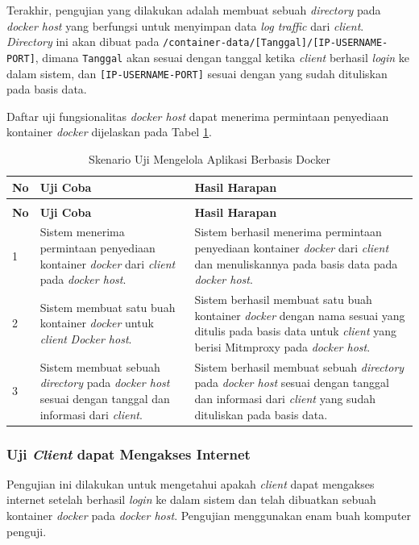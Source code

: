 Terakhir, pengujian yang dilakukan adalah membuat sebuah \textit{directory} pada \textit{docker host} yang berfungsi untuk menyimpan data \textit{log traffic} dari \textit{client}. \textit{Directory} ini akan dibuat pada \texttt{/container-data/[Tanggal]/[IP-USERNAME-PORT]}, dimana \texttt{Tanggal} akan sesuai dengan tanggal ketika \textit{client} berhasil \textit{login} ke dalam sistem, dan \texttt{[IP-USERNAME-PORT]} sesuai dengan yang sudah dituliskan pada basis data.

Daftar uji fungsionalitas \textit{docker host} dapat menerima permintaan penyediaan kontainer \textit{docker} dijelaskan pada Tabel \ref{ujicoba3}.

\begin{longtable}{|p{}|p{}|p{}|}					\caption{Skenario Uji \textit{Docker Host} dapat Menerima Permintaan Penyediaan Kontainer \textit{Docker}} \label{ujicoba3} \\
	\hline
	\textbf{No} & \textbf{Uji Coba} & \textbf{Hasil Harapan} \\ \hline
	\endfirsthead
	\caption[]{Skenario Uji Mengelola Aplikasi Berbasis Docker} \\
	\hline
	\textbf{No} & \textbf{Uji Coba} & \textbf{Hasil Harapan} \\ \hline
	\endhead
	\endfoot
	\endlastfoot
	
	1 & Sistem menerima permintaan penyediaan kontainer \textit{docker} dari \textit{client} pada \textit{docker host}. & Sistem berhasil menerima permintaan penyediaan kontainer \textit{docker} dari \textit{client} dan menuliskannya pada basis data pada \textit{docker host}.\\ \hline
	2 & Sistem membuat satu buah kontainer \textit{docker} untuk \textit{client} \textit{Docker host}. & Sistem berhasil membuat satu buah kontainer \textit{docker} dengan nama sesuai yang ditulis pada basis data untuk \textit{client} yang berisi Mitmproxy pada \textit{docker host}.\\ \hline
	3 & Sistem membuat sebuah \textit{directory} pada \textit{docker host} sesuai dengan tanggal dan informasi dari \textit{client}. & Sistem berhasil membuat sebuah \textit{directory} pada \textit{docker host} sesuai dengan tanggal dan informasi dari \textit{client} yang sudah dituliskan pada basis data.\\ \hline
\end{longtable}

\subsubsection{Uji \textit{Client} dapat Mengakses Internet}
Pengujian ini dilakukan untuk mengetahui apakah \textit{client} dapat mengakses internet setelah berhasil \textit{login} ke dalam sistem dan telah dibuatkan sebuah kontainer \textit{docker} pada \textit{docker host}. Pengujian menggunakan enam buah komputer penguji.

